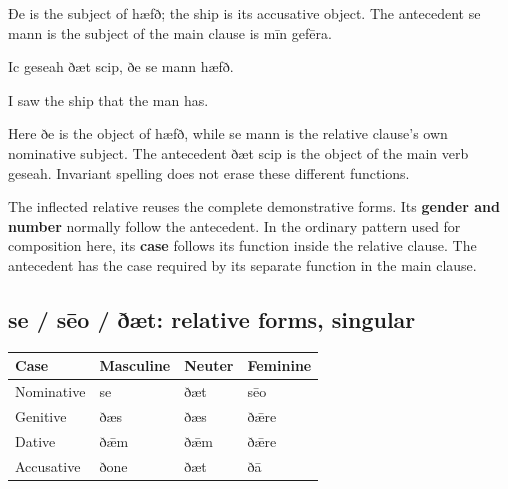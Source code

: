 Ðe is the subject of hæfð; the ship is its accusative object. The antecedent se mann is the subject of the main clause is mīn gefēra.

Ic geseah ðæt scip, ðe se mann hæfð.

I saw the ship that the man has.

Here ðe is the object of hæfð, while se mann is the relative clause’s own nominative subject. The antecedent ðæt scip is the object of the main verb geseah. Invariant spelling does not erase these different functions.

The inflected relative reuses the complete demonstrative forms. Its \textbf{gender and number} normally follow the antecedent. In the ordinary pattern used for composition here, its \textbf{case} follows its function inside the relative clause. The antecedent has the case required by its separate function in the main clause.

\subsection*{se /\allowbreak{} sēo /\allowbreak{} ðæt: relative forms, singular}

\par\begingroup
\fontsize{10.5}{13.2}\selectfont
\setlength{\LTleft}{0pt}\setlength{\LTright}{\fill}
\noindent
\begin{tabular}{@{}>{\raggedright\arraybackslash}p{28.89mm}>{\raggedright\arraybackslash}p{28.89mm}>{\raggedright\arraybackslash}p{28.89mm}>{\raggedright\arraybackslash}p{28.89mm}@{}}
\toprule
\textbf{Case} & \textbf{Masculine} & \textbf{Neuter} & \textbf{Feminine} \\
\midrule
Nominative & se & ðæt & sēo \\
Genitive & ðæs & ðæs & ðǣre \\
Dative & ðǣm & ðǣm & ðǣre \\
Accusative & ðone & ðæt & ðā \\
\bottomrule
\end{tabular}
\par\endgroup


